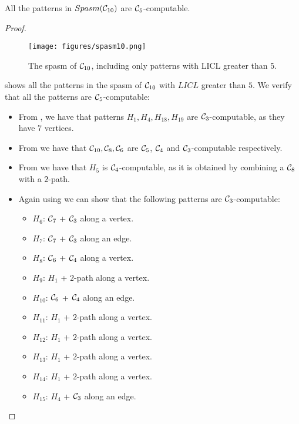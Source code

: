\documentclass[a4paper,UKenglish,cleveref, autoref, numberwithinsect, thm-restate]{lipics-v2021}
\newcommand{\computable}[1]{${#1}$-computable}
\newcommand{\cycle}[1]{\cC_{#1}}
\newcommand{\LICL}{LICL}
\newcommand{\Spasm}{Spasm}
\newcommand{\cC}{{\cal C}}
\begin{document}
	\begin{lemma}
		All the patterns in $\Spasm(\cycle{10})$ are \computable{\cycle{5}}.
	\end{lemma}
	\begin{proof}
		\begin{figure}
			\centering
			\texttt{[image: figures/spasm10.png]}\caption{The spasm of $\cycle{10}$, including only patterns with \LICL{} greater than $5$.}
			\label{fig:spasm10}
		\end{figure}
		
		 shows all the patterns in the spasm of $\cycle{10}$ with $\LICL{}$ greater than $5$. We verify that all the patterns are \computable{\cycle{5}}:
		
		\begin{itemize}
			\item From , we have that patterns $H_1, H_4, H_{18}, H_{19}$ are \computable{\cycle{3}}, as they have $7$ vertices.
			\item From  we have that $\cycle{10}, \cycle{8}, \cycle{6}$ are $\cycle{5}$, $\cycle{4}$ and \computable{\cycle{3}} respectively.
			\item From  we have that $H_5$ is \computable{\cycle{4}}, as it is obtained by combining a $\cycle{8}$ with a $2$-path.
			\item Again using  we can show that the following patterns are \computable{\cycle{3}}:
			\begin{itemize}
				\item $H_6$: $\cycle{7}$ + $\cycle{3}$ along a vertex.
				\item $H_7$: $\cycle{7}$ + $\cycle{3}$ along an edge.
				\item $H_8$: $\cycle{6}$ + $\cycle{4}$ along a vertex.
				\item $H_9$: $H_1$ + $2$-path along a vertex.
				\item $H_{10}$: $\cycle{6}$ + $\cycle{4}$ along an edge.
				\item $H_{11}$: $H_1$ + $2$-path along a vertex.
				\item $H_{12}$: $H_1$ + $2$-path along a vertex.
				\item $H_{13}$: $H_1$ + $2$-path along a vertex.
				\item $H_{14}$: $H_1$ + $2$-path along a vertex.
				\item $H_{15}$: $H_4$ + $\cycle{3}$ along an edge.
			\end{itemize}
		\end{itemize}
		

\end{proof}
\end{document}
